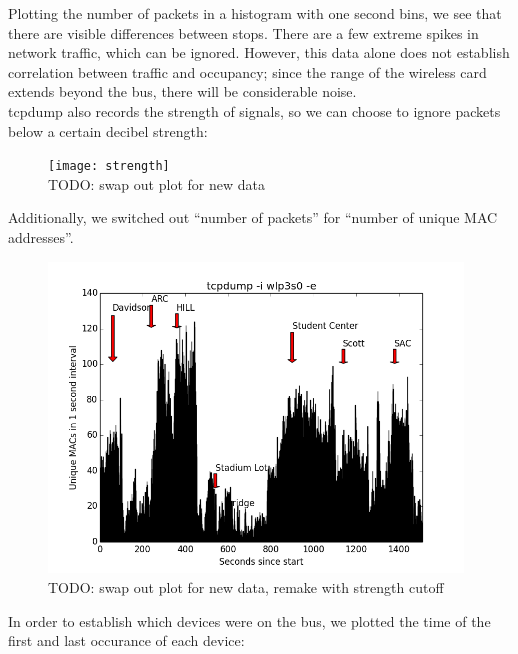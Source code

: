 \documentclass[letterpaper,abstract=on,titlepage=false]{scrreprt}
\begin{document}
	Plotting the number of packets in a histogram with one second bins, we see that there are visible differences between stops.
	There are a few extreme spikes in network traffic, which can be ignored.
	However, this data alone does not establish correlation between traffic and occupancy; since the range of the wireless card extends beyond the bus, there will be considerable noise.
	\\
	tcpdump also records the strength of signals, so we can choose to ignore packets below a certain decibel strength:

	\begin{figure}[H]
	\texttt{[image: strength]}
	\\TODO: swap out plot for new data
	\centering
	\end{figure}

	Additionally, we switched out ``number of packets'' for ``number of unique MAC addresses''.

	\begin{figure}[H]
	\includegraphics[width=11cm]{unique}
	\\TODO: swap out plot for new data, remake with strength cutoff
	\centering
	\end{figure}

	In order to establish which devices were on the bus, we plotted the time of the first and last occurance of each device:
\end{document}

